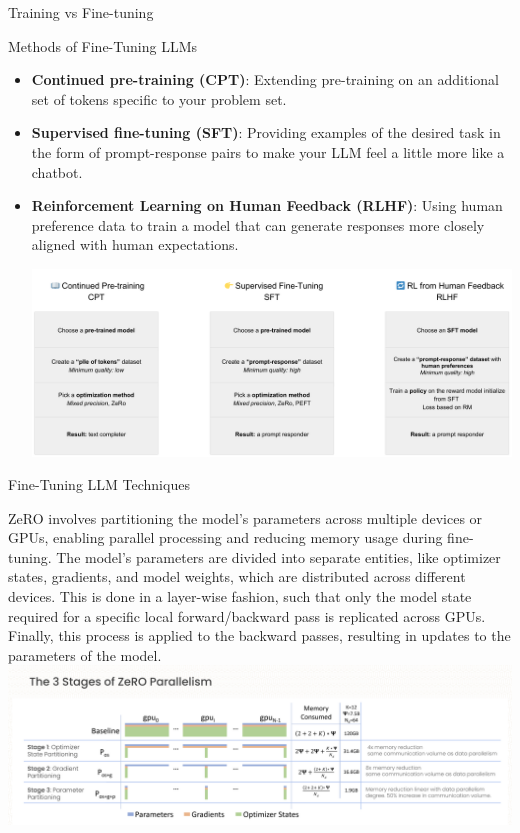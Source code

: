 \documentclass[final]{beamer}
\newlength{\colwidth}
\begin{document}
\begin{frame}[t]
\begin{columns}[t]
\begin{column}{\colwidth}
\begin{exampleblock}{Training vs Fine-tuning}
  \end{exampleblock}

  \begin{block}{Methods of Fine-Tuning LLMs}

    \begin{itemize}

      \item \textbf{Continued pre-training (CPT)}: Extending pre-training on an additional set of tokens specific to your problem set.
\item \textbf{Supervised fine-tuning (SFT)}: Providing examples of the desired task in the form of prompt-response pairs to make your LLM feel a little more like a chatbot.
\item \textbf{Reinforcement Learning on Human Feedback (RLHF)}: Using human preference data to train a model that can generate responses more closely aligned with human expectations.


\centering
\includegraphics[width=0.8\columnwidth]{logos/comparison.png}
\end{itemize}
\end{block}

    \begin{block}{Fine-Tuning LLM Techniques}
        \begin{minipage}[t]{\textwidth}
            ZeRO involves partitioning the model's parameters across multiple devices or GPUs, enabling parallel processing and reducing memory usage during fine-tuning.
            The model's parameters are divided into separate entities, like optimizer states, gradients, and model weights, which are distributed across different devices.
            This is done in a layer-wise fashion, such that only the model state required for a specific local forward/backward pass is replicated across GPUs. Finally, this process is applied to the backward passes, resulting in updates to the parameters of the model. 
            \includegraphics[width=\textwidth]{logos/zero.png}
        \raggedright
        \end{minipage}


\end{block}
\end{column}
\end{columns}
\end{frame}
\end{document}
